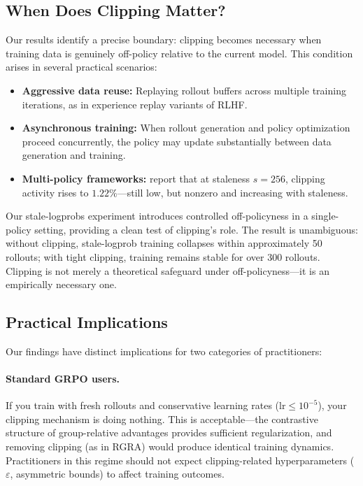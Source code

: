 \subsection{When Does Clipping Matter?}
\label{sec:when-clipping-matters}

Our results identify a precise boundary: clipping becomes necessary when training data is genuinely off-policy relative to the current model.
This condition arises in several practical scenarios:

\begin{itemize}
    \item \textbf{Aggressive data reuse:} Replaying rollout buffers across multiple training iterations, as in experience replay variants of RLHF.
    \item \textbf{Asynchronous training:} When rollout generation and policy optimization proceed concurrently, the policy may update substantially between data generation and training.
    \item \textbf{Multi-policy frameworks:} \citet{prosperity2025} report that at staleness $s = 256$, clipping activity rises to $1.22\%$---still low, but nonzero and increasing with staleness.
\end{itemize}

Our stale-logprobs experiment introduces controlled off-policyness in a single-policy setting, providing a clean test of clipping's role.
The result is unambiguous: without clipping, stale-logprob training collapses within approximately 50 rollouts; with tight clipping, training remains stable for over 300 rollouts.
Clipping is not merely a theoretical safeguard under off-policyness---it is an empirically necessary one.

\subsection{Practical Implications}
\label{sec:practical-implications}

Our findings have distinct implications for two categories of practitioners:

\paragraph{Standard GRPO users.}
If you train with fresh rollouts and conservative learning rates ($\text{lr} \leq 10^{-5}$), your clipping mechanism is doing nothing.
This is acceptable---the contrastive structure of group-relative advantages provides sufficient regularization, and removing clipping (as in RGRA) would produce identical training dynamics.
Practitioners in this regime should not expect clipping-related hyperparameters ($\varepsilon$, asymmetric bounds) to affect training outcomes.

